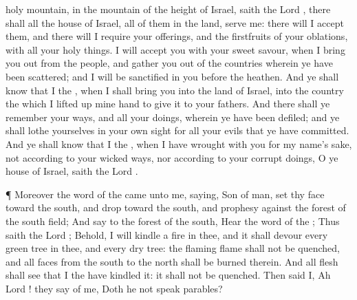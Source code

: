{holy
mountain, in the
mountain of the
height of
Israel,
saith the
Lord
{}, there shall all the
house of
Israel, all of them in the
land,
serve me: there will I
accept them, and there will I
require your
offerings, and the
firstfruits of your
oblations, with all your holy
things.
I will
accept you with your
sweet
savour, when I bring you
out from the
people, and
gather you out of the
countries wherein ye have been
scattered; and I will be
sanctified in you
before the
heathen.
And ye shall
know that I
{} the
{}, when I shall
bring you into the
land of
Israel, into the
country
{} the which I lifted
up mine
hand to
give it to your
fathers.
And there shall ye
remember your
ways, and all your
doings, wherein ye have been
defiled; and ye shall
lothe yourselves in your own
sight for all your
evils that ye have
committed.
And ye shall
know that I
{} the
{}, when I have
wrought with you for my
name’s sake, not according to your
wicked
ways, nor according to your
corrupt
doings, O ye
house of
Israel,
saith the
Lord
{}.
\par }{\PP {}¶ Moreover the
word of the
{} came unto me,
saying,
Son of
man,
set thy
face
toward the
south, and
drop
{} toward the
south, and
prophesy against the
forest of the
south
field;
And
say to the
forest of the
south,
Hear the
word of the
{}; Thus
saith the
Lord
{}; Behold, I will
kindle a
fire in thee, and it shall
devour every
green
tree in thee, and every
dry
tree: the
flaming
flame shall not be
quenched, and all
faces from the
south to the
north shall be
burned therein.
And all
flesh shall
see that I the
{} have
kindled it: it shall not be
quenched.
Then
said I,
Ah
Lord
{}! they
say of me, Doth he not
speak
parables?

}
